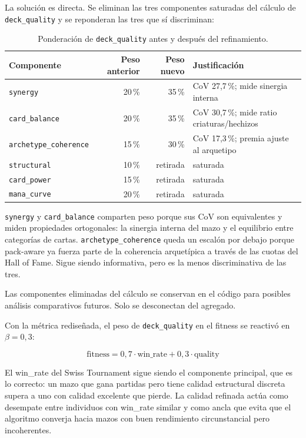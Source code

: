 La solución es directa. Se eliminan las tres componentes saturadas del cálculo de \texttt{deck\_quality} y se reponderan las tres que sí discriminan:

\begin{table}[H]
\centering
\caption{Ponderación de \texttt{deck\_quality} antes y después del refinamiento.}
\label{tab:quality-pesos}
\begin{tabular}{lrrl}
\toprule
\textbf{Componente} & \textbf{Peso anterior} & \textbf{Peso nuevo} & \textbf{Justificación} \\
\midrule
\texttt{synergy}             & 20\,\% & 35\,\% & CoV 27,7\,\%; mide sinergia interna \\
\texttt{card\_balance}       & 20\,\% & 35\,\% & CoV 30,7\,\%; mide ratio criaturas/hechizos \\
\texttt{archetype\_coherence}& 15\,\% & 30\,\% & CoV 17,3\,\%; premia ajuste al arquetipo \\
\midrule
\texttt{structural}          & 10\,\% & retirada & saturada \\
\texttt{card\_power}         & 15\,\% & retirada & saturada \\
\texttt{mana\_curve}         & 20\,\% & retirada & saturada \\
\bottomrule
\end{tabular}
\end{table}

\texttt{synergy} y \texttt{card\_balance} comparten peso porque sus CoV son equivalentes y miden propiedades ortogonales: la sinergia interna del mazo y el equilibrio entre categorías de cartas. \texttt{archetype\_coherence} queda un escalón por debajo porque pack-aware ya fuerza parte de la coherencia arquetípica a través de las cuotas del Hall of Fame. Sigue siendo informativa, pero es la menos discriminativa de las tres.

Las componentes eliminadas del cálculo se conservan en el código para posibles análisis comparativos futuros. Solo se desconectan del agregado.

Con la métrica rediseñada, el peso de \texttt{deck\_quality} en el fitness se reactivó en $\beta = 0{,}3$:

$$\text{fitness} = 0{,}7 \cdot \text{win\_rate} + 0{,}3 \cdot \text{quality}$$

El win\_rate del Swiss Tournament sigue siendo el componente principal, que es lo correcto: un mazo que gana partidas pero tiene calidad estructural discreta supera a uno con calidad excelente que pierde. La calidad refinada actúa como desempate entre individuos con win\_rate similar y como ancla que evita que el algoritmo converja hacia mazos con buen rendimiento circunstancial pero incoherentes.

